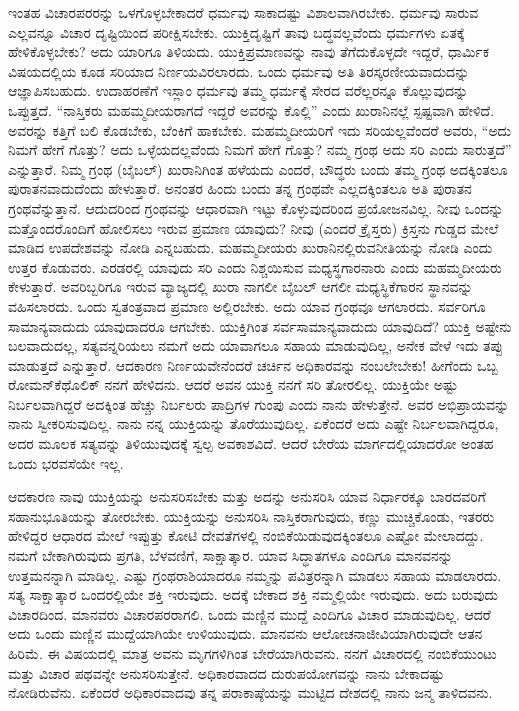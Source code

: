 ಇಂತಹ ವಿಚಾರಪರರನ್ನು ಒಳಗೊಳ್ಳಬೇಕಾದರೆ ಧರ್ಮವು ಸಾಕಾದಷ್ಟು ವಿಶಾಲವಾಗಿರಬೇಕು. ಧರ್ಮವು ಸಾರುವ ಎಲ್ಲವನ್ನೂ ವಿಚಾರ ದೃಷ್ಟಿಯಿಂದ ಪರೀಕ್ಷಿಸಬೇಕು. ಯುಕ್ತಿದೃಷ್ಟಿಗೆ ತಾವು ಬದ್ಧವಲ್ಲವೆಂದು ಧರ್ಮಗಳು ಏತಕ್ಕೆ ಹೇಳಿಕೊಳ್ಳಬೇಕು? ಅದು ಯಾರಿಗೂ ತಿಳಿಯದು. ಯುಕ್ತಿಪ್ರಮಾಣವನ್ನು ನಾವು ತೆಗೆದುಕೊಳ್ಳದೇ ಇದ್ದರೆ, ಧಾರ್ಮಿಕ ವಿಷಯದಲ್ಲಿಯ ಕೂಡ ಸರಿಯಾದ ನಿರ್ಣಯವಿರಲಾರದು. ಒಂದು ಧರ್ಮವು ಅತಿ ತಿರಸ್ಕರಣೀಯವಾದುದನ್ನು ಆಜ್ಞಾಪಿಸಬಹುದು. ಉದಾಹರಣೆಗೆ ಇಸ್ಲಾಂ ಧರ್ಮವು ತಮ್ಮ ಧರ್ಮಕ್ಕೆ ಸೇರದ ವರೆಲ್ಲರನ್ನೂ ಕೊಲ್ಲುವುದನ್ನು ಒಪ್ಪುತ್ತದೆ. “ನಾಸ್ತಿಕರು ಮಹಮ್ಮದೀಯರಾಗದೆ ಇದ್ದರೆ ಅವರನ್ನು ಕೊಲ್ಲಿ” ಎಂದು ಖುರಾನಿನಲ್ಲೆ ಸ್ಪಷ್ಟವಾಗಿ ಹೇಳಿದೆ. ಅವರನ್ನು ಕತ್ತಿಗೆ ಬಲಿ ಕೊಡಬೇಕು, ಬೆಂಕಿಗೆ ಹಾಕಬೇಕು. ಮಹಮ್ಮದೀಯರಿಗೆ ಇದು ಸರಿಯಲ್ಲವೆಂದರೆ ಅವರು, “ಅದು ನಿಮಗೆ ಹೇಗೆ ಗೊತ್ತು? ಅದು ಒಳ್ಳೆಯದಲ್ಲವೆಂದು ನಿಮಗೆ ಹೇಗೆ ಗೊತ್ತು? ನಮ್ಮ ಗ್ರಂಥ ಅದು ಸರಿ ಎಂದು ಸಾರುತ್ತದೆ” ಎನ್ನುತ್ತಾರೆ. ನಿಮ್ಮ ಗ್ರಂಥ (ಬೈಬಲ್​) ಖುರಾನಿಗಿಂತ ಹಳೆಯದು ಎಂದರೆ, ಬೌದ್ಧರು ಬಂದು ತಮ್ಮ ಗ್ರಂಥ ಅದಕ್ಕಿಂತಲೂ ಪುರಾತನವಾದುದೆಂದು ಹೇಳುತ್ತಾರೆ. ಅನಂತರ ಹಿಂದು ಬಂದು ತನ್ನ ಗ್ರಂಥವೇ ಎಲ್ಲದಕ್ಕಿಂತಲೂ ಅತಿ ಪುರಾತನ ಗ್ರಂಥವೆನ್ನುತ್ತಾನೆ. ಆದುದರಿಂದ ಗ್ರಂಥವನ್ನು ಆಧಾರವಾಗಿ ಇಟ್ಟು ಕೊಳ್ಳುವುದರಿಂದ ಪ್ರಯೋಜನವಿಲ್ಲ. ನೀವು ಒಂದನ್ನು ಮತ್ತೊಂದರೊಂದಿಗೆ ಹೋಲಿಸಲು ಇರುವ ಪ್ರಮಾಣ ಯಾವುದು? ನೀವು (ಎಂದರೆ ಕ್ರೈಸ್ತರು) ಕ್ರಿಸ್ತನು ಗುಡ್ಡದ ಮೇಲೆ ಮಾಡಿದ ಉಪದೇಶವನ್ನು ನೋಡಿ ಎನ್ನಬಹುದು. ಮಹಮ್ಮದೀಯರು ಖುರಾನಿನಲ್ಲಿರುವ\break ನೀತಿಯನ್ನು ನೋಡಿ ಎಂದು ಉತ್ತರ ಕೊಡುವರು. ಎರಡರಲ್ಲಿ ಯಾವುದು ಸರಿ ಎಂದು ನಿಶ್ಚಯಿಸುವ ಮಧ್ಯಸ್ಥಗಾರನಾರು ಎಂದು ಮಹಮ್ಮದೀಯರು ಕೇಳುತ್ತಾರೆ. ಅವರಿಬ್ಬರಿಗೂ ಇರುವ ವ್ಯಾಜ್ಯದಲ್ಲಿ ಖುರಾ ನಾಗಲೀ ಬೈಬಲ್​ ಆಗಲೀ ಮಧ್ಯಸ್ಥಿಕೆಗಾರನ ಸ್ಥಾನವನ್ನು ವಹಿಸಲಾರದು. ಒಂದು ಸ್ವತಂತ್ರವಾದ ಪ್ರಮಾಣ ಅಲ್ಲಿರಬೇಕು. ಅದು ಯಾವ ಗ್ರಂಥವೂ ಆಗಲಾರದು. ಸರ್ವರಿಗೂ ಸಾಮಾನ್ಯವಾದುದು ಯಾವುದಾದರೂ ಆಗಬೇಕು. ಯುಕ್ತಿಗಿಂತ ಸರ್ವಸಾಮಾನ್ಯವಾದುದು ಯಾವುದಿದೆ? ಯುಕ್ತಿ ಅಷ್ಟೇನು ಬಲವಾದುದಲ್ಲ, ಸತ್ಯವನ್ನರಿಯಲು ನಮಗೆ ಅದು ಯಾವಾಗಲೂ ಸಹಾಯ ಮಾಡುವುದಿಲ್ಲ, ಅನೇಕ ವೇಳೆ ಇದು ತಪ್ಪು ಮಾಡುತ್ತದೆ ಎನ್ನುತ್ತಾರೆ. ಆದಕಾರಣ ನಿರ್ಣಯವೇನೆಂದರೆ ಚರ್ಚಿನ ಅಧಿಕಾರವನ್ನು ನಂಬಲೇಬೇಕು! ಹೀಗೆಂದು ಒಬ್ಬ ರೋಮನ್​ ಕೆಥೊಲಿಕ್​ ನನಗೆ ಹೇಳಿದನು. ಆದರೆ ಅವನ ಯುಕ್ತಿ ನನಗೆ ಸರಿ ತೋರಲಿಲ್ಲ. ಯುಕ್ತಿಯೇ ಅಷ್ಟು ನಿರ್ಬಲವಾಗಿದ್ದರೆ ಅದಕ್ಕಿಂತ ಹೆಚ್ಚು ನಿರ್ಬಲರು ಪಾದ್ರಿಗಳ ಗುಂಪು ಎಂದು ನಾನು ಹೇಳುತ್ತೇನೆ. ಅವರ ಅಭಿಪ್ರಾಯವನ್ನು ನಾನು ಸ್ವೀಕರಿಸುವುದಿಲ್ಲ. ನಾನು ನನ್ನ ಯುಕ್ತಿಯನ್ನು ತೊರೆಯುವುದಿಲ್ಲ. ಏಕೆಂದರೆ ಅದು ಎಷ್ಟೇ ನಿರ್ಬಲವಾಗಿದ್ದರೂ, ಅದರ ಮೂಲಕ ಸತ್ಯವನ್ನು ತಿಳಿಯುವುದಕ್ಕೆ ಸ್ವಲ್ಪ ಅವಕಾಶವಿದೆ. ಆದರೆ ಬೇರೆಯ ಮಾರ್ಗದಲ್ಲಿಯಾದರೋ ಅಂತಹ ಒಂದು ಭರವಸೆಯೇ ಇಲ್ಲ. 

ಆದಕಾರಣ ನಾವು ಯುಕ್ತಿಯನ್ನು ಅನುಸರಿಸಬೇಕು ಮತ್ತು ಅದನ್ನು ಅನುಸರಿಸಿ ಯಾವ ನಿರ್ಧಾರಕ್ಕೂ ಬಾರದವರಿಗೆ ಸಹಾನುಭೂತಿಯನ್ನು ತೋರಬೇಕು. ಯುಕ್ತಿಯನ್ನು ಅನುಸರಿಸಿ ನಾಸ್ತಿಕರಾಗುವುದು, ಕಣ್ಣು ಮುಚ್ಚಿಕೊಂಡು, ಇತರರು ಹೇಳಿದ್ದರ ಆಧಾರದ ಮೇಲೆ ಇಪ್ಪುತ್ತು ಕೋಟಿ ದೇವತೆಗಳಲ್ಲಿ ನಂಬಿಕೆಯಿಡುವುದಕ್ಕಿಂತಲೂ ಎಷ್ಟೋ ಮೇಲಾದದ್ದು. ನಮಗೆ ಬೇಕಾಗಿರುವುದು ಪ್ರಗತಿ, ಬೆಳವಣಿಗೆ, ಸಾಕ್ಷಾತ್ಕಾರ. ಯಾವ ಸಿದ್ಧಾತಗಳೂ ಎಂದಿಗೂ ಮಾನವನನ್ನು ಉತ್ತಮನನ್ನಾಗಿ ಮಾಡಿಲ್ಲ. ಎಷ್ಟು ಗ್ರಂಥರಾಶಿಯಾದರೂ ನಮ್ಮನ್ನು ಪವಿತ್ರರನ್ನಾಗಿ ಮಾಡಲು ಸಹಾಯ ಮಾಡಲಾರದು. ಸತ್ಯ ಸಾಕ್ಷಾತ್ಕಾರ ಒಂದರಲ್ಲಿಯೇ ಶಕ್ತಿ ಇರುವುದು. ಅದಕ್ಕೆ ಬೇಕಾದ ಶಕ್ತಿ ನಮ್ಮಲ್ಲಿಯೇ ಇರುವುದು. ಅದು ಬರುವುದು ವಿಚಾರದಿಂದ. ಮಾನವರು ವಿಚಾರಪರರಾಗಲಿ. ಒಂದು ಮಣ್ಣಿನ ಮುದ್ದೆ ಎಂದಿಗೂ ವಿಚಾರ ಮಾಡುವುದಿಲ್ಲ. ಆದರೆ ಅದು ಒಂದು ಮಣ್ಣಿನ ಮುದ್ದೆಯಾಗಿಯೇ ಉಳಿಯುವುದು. ಮಾನವನು ಆಲೋಚನಾಜೀವಿಯಾಗಿರುವುದೇ ಆತನ ಹಿರಿಮೆ. ಈ ವಿಷಯದಲ್ಲಿ ಮಾತ್ರ ಅವನು ಮೃಗಗಳಿಗಿಂತ ಬೇರೆಯಾಗಿರುವನು. ನನಗೆ ವಿಚಾರದಲ್ಲಿ ನಂಬಿಕೆಯುಂಟು ಮತ್ತು ವಿಚಾರ ಪಥವನ್ನೇ ಅನುಸರಿಸುತ್ತೇನೆ. ಅಧಿಕಾರವಾದದ  ದುರುಪಯೋಗವನ್ನು ನಾನು ಬೇಕಾದಷ್ಟು ನೋಡಿರುವೆನು. ಏಕೆಂದರೆ ಅಧಿಕಾರವಾದವು ತನ್ನ ಪರಾಕಾಷ್ಠೆಯನ್ನು ಮುಟ್ಟಿದ ದೇಶದಲ್ಲಿ ನಾನು ಜನ್ಮ ತಾಳಿದವನು. 

